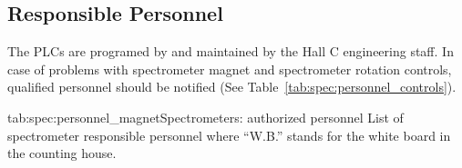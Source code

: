 \subsection{Responsible Personnel}
The PLCs are programed by and maintained by the Hall C engineering
staff.  In case of problems with spectrometer magnet and spectrometer
rotation controls, qualified personnel should be notified
(See Table~\ref{tab:spec:personnel_controls}).

\begin{namestab}{tab:spec:personnel_magnet}{Spectrometers: authorized personnel}{%
      List of spectrometer responsible personnel where ``W.B.'' stands for the white board 
      in the counting house.}
   \MikeFowler{}
   \PaulBrindza{}
   \SteveLassiter{}
   \EricSun{}
\end{namestab}






